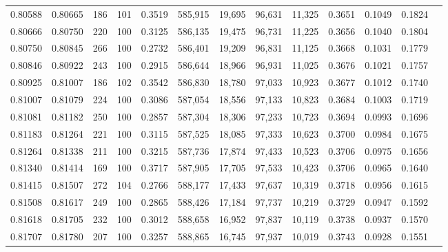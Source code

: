 \begin{tabular}{rrrrrrrrrrrrr}
0.80588 & 0.80665 &   186 & 101 &                                     0.3519 & 585,915 &  19,695 &  96,631 &  11,325 & 0.3651 & 0.1049 & 0.1824 \\
0.80666 & 0.80750 &   220 & 100 &                                     0.3125 & 586,135 &  19,475 &  96,731 &  11,225 & 0.3656 & 0.1040 & 0.1804 \\
0.80750 & 0.80845 &   266 & 100 &                                     0.2732 & 586,401 &  19,209 &  96,831 &  11,125 & 0.3668 & 0.1031 & 0.1779 \\
0.80846 & 0.80922 &   243 & 100 &                                     0.2915 & 586,644 &  18,966 &  96,931 &  11,025 & 0.3676 & 0.1021 & 0.1757 \\
0.80925 & 0.81007 &   186 & 102 &                                     0.3542 & 586,830 &  18,780 &  97,033 &  10,923 & 0.3677 & 0.1012 & 0.1740 \\
0.81007 & 0.81079 &   224 & 100 &                                     0.3086 & 587,054 &  18,556 &  97,133 &  10,823 & 0.3684 & 0.1003 & 0.1719 \\
0.81081 & 0.81182 &   250 & 100 &                                     0.2857 & 587,304 &  18,306 &  97,233 &  10,723 & 0.3694 & 0.0993 & 0.1696 \\
0.81183 & 0.81264 &   221 & 100 &                                     0.3115 & 587,525 &  18,085 &  97,333 &  10,623 & 0.3700 & 0.0984 & 0.1675 \\
0.81264 & 0.81338 &   211 & 100 &                                     0.3215 & 587,736 &  17,874 &  97,433 &  10,523 & 0.3706 & 0.0975 & 0.1656 \\
0.81340 & 0.81414 &   169 & 100 &                                     0.3717 & 587,905 &  17,705 &  97,533 &  10,423 & 0.3706 & 0.0965 & 0.1640 \\
0.81415 & 0.81507 &   272 & 104 &                                     0.2766 & 588,177 &  17,433 &  97,637 &  10,319 & 0.3718 & 0.0956 & 0.1615 \\
0.81508 & 0.81617 &   249 & 100 &                                     0.2865 & 588,426 &  17,184 &  97,737 &  10,219 & 0.3729 & 0.0947 & 0.1592 \\
0.81618 & 0.81705 &   232 & 100 &                                     0.3012 & 588,658 &  16,952 &  97,837 &  10,119 & 0.3738 & 0.0937 & 0.1570 \\
0.81707 & 0.81780 &   207 & 100 &                                     0.3257 & 588,865 &  16,745 &  97,937 &  10,019 & 0.3743 & 0.0928 & 0.1551 \\

\end{tabular}
